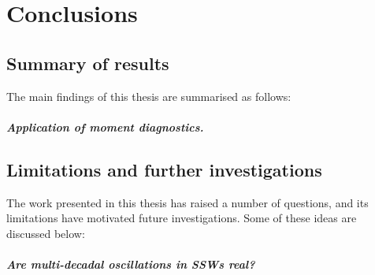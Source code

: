 \chapter{Conclusions}
\label{cha:conclusions}

\section{Summary of results}

The main findings of this thesis are summarised as follows: 

\paragraph{Application of moment diagnostics.}%

\section{Limitations and further investigations}

The work presented in this thesis has raised a number of questions, and its
limitations have motivated future investigations. Some of these ideas are
discussed below:

\paragraph{Are multi-decadal oscillations in SSWs real?} 


